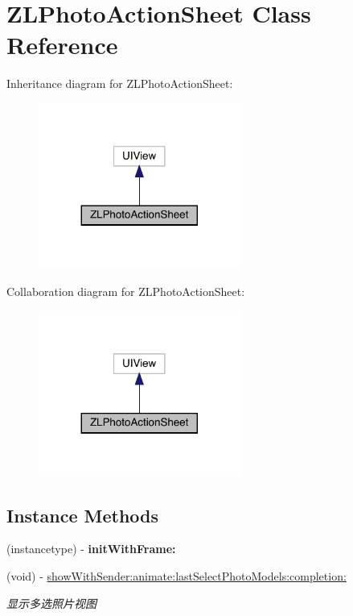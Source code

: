 \hypertarget{interface_z_l_photo_action_sheet}{}\section{Z\+L\+Photo\+Action\+Sheet Class Reference}
\label{interface_z_l_photo_action_sheet}


Inheritance diagram for Z\+L\+Photo\+Action\+Sheet\+:\nopagebreak
\begin{figure}[H]
\begin{center}
\leavevmode
\includegraphics[width=188pt]{interface_z_l_photo_action_sheet__inherit__graph}
\end{center}
\end{figure}


Collaboration diagram for Z\+L\+Photo\+Action\+Sheet\+:\nopagebreak
\begin{figure}[H]
\begin{center}
\leavevmode
\includegraphics[width=188pt]{interface_z_l_photo_action_sheet__coll__graph}
\end{center}
\end{figure}
\subsection*{Instance Methods}
\begin{DoxyCompactItemize}
\item 
\mbox{\label{interface_z_l_photo_action_sheet_ab9b505c6dc5a375784b4219e8f05fd52}} 
(instancetype) -\/ {\bfseries init\+With\+Frame\+:}
\item 
(void) -\/ \mbox{\hyperlink{interface_z_l_photo_action_sheet_a0dcf2f7529b740ee550d737e82f79755}{show\+With\+Sender\+:animate\+:last\+Select\+Photo\+Models\+:completion\+:}}
\begin{DoxyCompactList}\small\item\em 显示多选照片视图 \end{DoxyCompactList}\end{DoxyCompactItemize}
